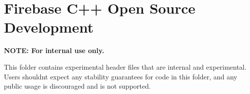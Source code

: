 \chapter{Firebase C++ Open Source Development}
\hypertarget{md_build_2windows_2x64_2extracted_2firebase__cpp__sdk__windows_2include_2firebase_2gma_2internal_2_r_e_a_d_m_e}{}\label{md_build_2windows_2x64_2extracted_2firebase__cpp__sdk__windows_2include_2firebase_2gma_2internal_2_r_e_a_d_m_e}
\label{md_build_2windows_2x64_2extracted_2firebase__cpp__sdk__windows_2include_2firebase_2gma_2internal_2_r_e_a_d_m_e_autotoc_md0}%
%


{\bfseries{NOTE\+: For internal use only.}}

This folder contains experimental header files that are internal and experimental. Users shouldn\textquotesingle{}t expect any stability guarantees for code in this folder, and any public usage is discouraged and is not supported. 